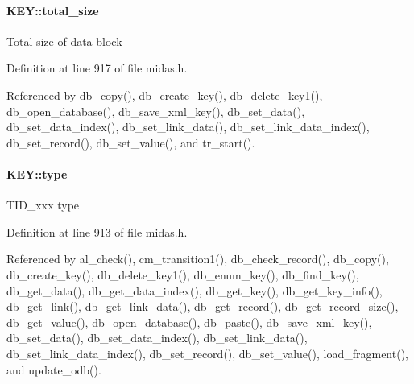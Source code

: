 \paragraph[{total\_\-size}]{ {\bf KEY::total\_\-size}}\hfill\label{structKEY_a553ba6fe87ca0b1dd08bcdc8fa15e6fa}
Total size of data block 

Definition at line 917 of file midas.h.

Referenced by db\_\-copy(), db\_\-create\_\-key(), db\_\-delete\_\-key1(), db\_\-open\_\-database(), db\_\-save\_\-xml\_\-key(), db\_\-set\_\-data(), db\_\-set\_\-data\_\-index(), db\_\-set\_\-link\_\-data(), db\_\-set\_\-link\_\-data\_\-index(), db\_\-set\_\-record(), db\_\-set\_\-value(), and tr\_\-start().
\paragraph[{type}]{ {\bf KEY::type}}\hfill\label{structKEY_a3360f9082d5083ea144f093d0cd774e3}
TID\_\-xxx type 

Definition at line 913 of file midas.h.

Referenced by al\_\-check(), cm\_\-transition1(), db\_\-check\_\-record(), db\_\-copy(), db\_\-create\_\-key(), db\_\-delete\_\-key1(), db\_\-enum\_\-key(), db\_\-find\_\-key(), db\_\-get\_\-data(), db\_\-get\_\-data\_\-index(), db\_\-get\_\-key(), db\_\-get\_\-key\_\-info(), db\_\-get\_\-link(), db\_\-get\_\-link\_\-data(), db\_\-get\_\-record(), db\_\-get\_\-record\_\-size(), db\_\-get\_\-value(), db\_\-open\_\-database(), db\_\-paste(), db\_\-save\_\-xml\_\-key(), db\_\-set\_\-data(), db\_\-set\_\-data\_\-index(), db\_\-set\_\-link\_\-data(), db\_\-set\_\-link\_\-data\_\-index(), db\_\-set\_\-record(), db\_\-set\_\-value(), load\_\-fragment(), and update\_\-odb().